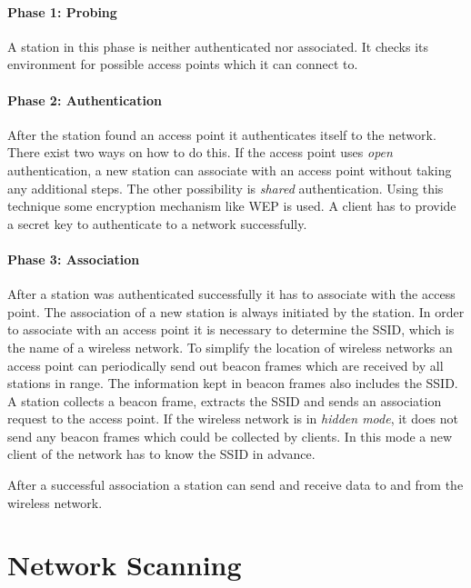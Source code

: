 \subsubsection{Phase 1: Probing}

A station in this phase is neither authenticated nor associated. It checks its environment for possible access points which it can connect to.

\subsubsection{Phase 2: Authentication}

After the station found an access point it authenticates itself to the network. There exist two ways on how to do this. If the access point uses {\em open} authentication, a new station can associate with an access point without taking any additional steps. The other possibility is {\em shared} authentication. Using this technique some encryption mechanism like WEP is used. A client has to provide a secret key to authenticate to a network successfully.

\subsubsection{Phase 3: Association}

After a station was authenticated successfully it has to associate with the access point. The association of a new station is always initiated by the station. In order to associate with an access point it is necessary to determine the SSID, which is the name of a wireless network. To simplify the location of wireless networks an access point can periodically send out beacon frames which are received by all stations in range. The information kept in beacon frames also includes the SSID. A station collects a beacon frame, extracts the SSID and sends an association request to the access point. If the wireless network is in {\em hidden mode}, it does not send any beacon frames which could be collected by clients. In this mode a new client of the network has to know the SSID in advance.

After a successful association a station can send and receive data to and from the wireless network.


\chapter{Network Scanning}

